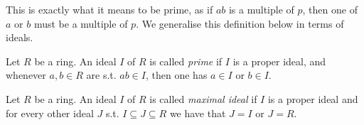 This is exactly what it means to be prime, as if $ab$ is a multiple of $p$, then one of $a$ or $b$ must be a multiple of $p$. We generalise this definition below in terms of ideals.

\begin{definition}
  Let $R$ be a ring. An ideal $I$ of $R$ is called \emph{prime} if $I$ is a proper ideal,
  and whenever $a,b\in R$ are s.t. $ab\in I$, then one has $a\in I$ or $b\in I$.
  \label{<+label+>}
\end{definition}

\begin{definition}
  Let $R$ be a ring. An ideal $I$ of $R$ is called \emph{maximal ideal} if $I$ is a proper
  ideal and for every other ideal $J$ s.t. $I\subseteq J \subseteq R$ we have that $J=I$
  or $J=R$.
  \label{def:maximalIdeal}
\end{definition}


